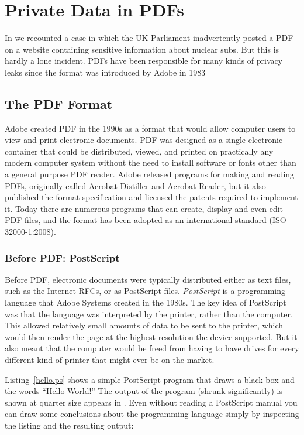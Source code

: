 \chapter{Private Data in PDFs}

In  we recounted a case in which the UK
Parliament inadvertently posted a PDF on a website containing
sensitive information about nuclear subs. But this is hardly a lone
incident. PDFs have been responsible for many kinds of privacy leaks
since the format was introduced by Adobe in 1983

\section{The PDF Format}

Adobe created PDF in the 1990s as a format that would allow computer
users to view and print electronic documents. PDF was designed as a
single electronic container that could be distributed, viewed, and
printed on practically any modern computer system without the need to
install  software or fonts other than a general purpose PDF
reader. Adobe released programs for making and reading PDFs,
originally called Acrobat Distiller and Acrobat Reader, but it also
published the format specification and licensed the patents required
to implement it. Today there are numerous programs that can create,
display and even edit PDF files, and the format has been adopted as an
international standard (ISO 32000-1:2008)\cite{ISO32000-1:2008}.

\subsection{Before PDF: PostScript}

Before PDF, electronic documents were typically distributed either as text
files, such as the Internet RFCs, or as PostScript
files. \emph{PostScript} is a programming language that Adobe Systems
created in the 1980s. The key idea 
of PostScript was that the language was interpreted by the printer, rather than 
the computer. This allowed relatively small amounts of data to be sent to
the printer, which would then render the page at the highest resolution
the device supported. But it also meant that the computer would be
freed from having to have drives for every different kind of printer
that might ever be on the market.

Listing~\ref{hello.ps} shows a simple PostScript program that draws a
black box and the words ``Hello World!''  The output of the program
(shrunk significantly) is shown at quarter size appears in
. Even without reading a PostScript manual you
can draw some conclusions about the programming language simply by 
inspecting the listing and the resulting output:

